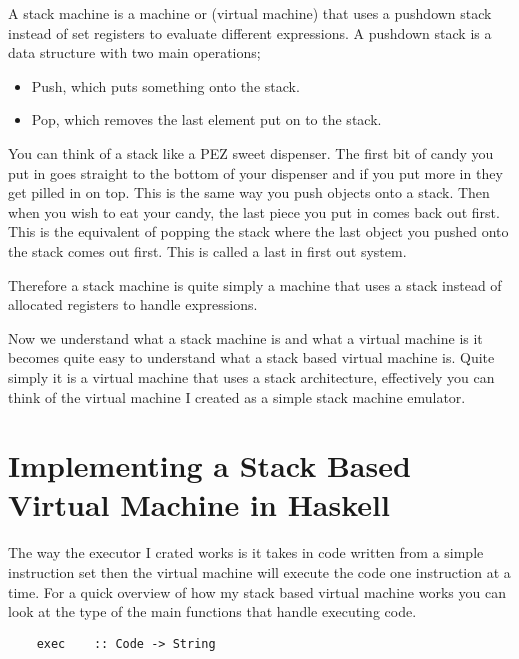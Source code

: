 A stack machine is a machine or (virtual machine) that uses a pushdown stack instead of set registers to evaluate different expressions\footnotemark[3]. A pushdown stack is a data structure with two main operations;

\begin{itemize}
\item Push, which puts something onto the stack.
\item Pop, which removes the last element put on to the stack.
\end{itemize} 


You can think of a stack like a PEZ sweet dispenser. The first bit of candy you put in goes straight to the bottom of your dispenser and if you put more in they get pilled in on top. This is the same way you push objects onto a stack. Then when you wish to eat your candy, the last piece you put in comes back out first. This is the equivalent of popping the stack where the last object you pushed onto the stack comes out first. This is called a last in first out system.    


Therefore a stack machine is quite simply a machine that uses a stack instead of allocated registers to handle expressions. 

Now we understand what a stack machine is and what a virtual machine is it becomes quite easy to understand what a stack based virtual machine is. Quite simply it is a virtual machine that uses a stack architecture, effectively you can think of the virtual machine I created as a simple stack machine emulator. 


\section[Implementing a Stack Based Virtual Machine]{Implementing a Stack Based \\ Virtual Machine in Haskell}

The way the executor I crated works is it takes in code written from a simple instruction set then the virtual machine will execute the code one instruction at a time. For a quick overview of how my stack based virtual machine works you can look at the type of the main functions that handle executing code.

\begin{lstlisting}
	exec	:: Code -> String
\end{lstlisting}

